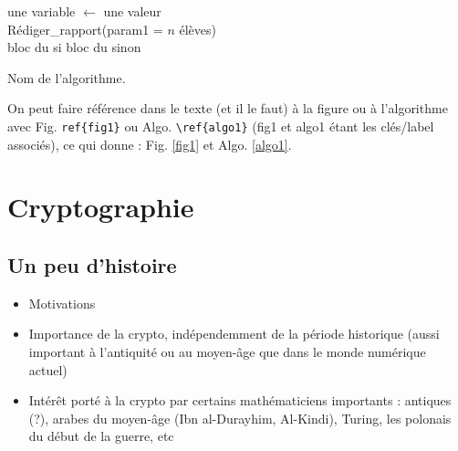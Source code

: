 \documentclass[a4paper,11pt]{article}
\begin{document}
\begin{center}
\begin{algorithm}[h!]
%
\BlankLine
{}
une variable $\leftarrow$ une valeur\\ %
Rédiger\_rapport(param1 = $n$ élèves)\\ %
  {bloc du si}
  {bloc du sinon}
\caption{Nom de l'algorithme.}
\label{algo1}
\end{algorithm}
\end{center}

On peut faire référence dans le texte (et il le faut) à la figure ou à l'algorithme avec Fig. \verb!ref{fig1}! ou Algo. \verb!\ref{algo1}! (fig1 et algo1 étant les clés/label associés), ce qui donne : Fig. \ref{fig1} et Algo. \ref{algo1}.

\section{Cryptographie}

\subsection{Un peu d'histoire}

\begin{itemize}
\item Motivations
\item Importance de la crypto, indépendemment de la période historique (aussi important à l'antiquité ou au moyen-âge que dans le monde numérique actuel)
\item Intérêt porté à la crypto par certains mathématiciens importants : antiques (?), arabes du moyen-âge (Ibn al-Durayhim, Al-Kindi), Turing, les polonais du début de la guerre, etc
\end{itemize}
\end{document}
